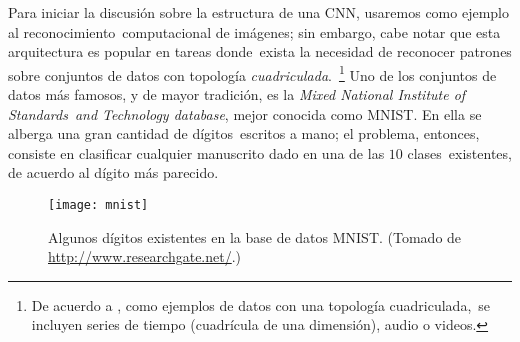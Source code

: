 Para iniciar la discusión sobre la estructura de una CNN, usaremos como ejemplo al reconocimiento\
computacional de imágenes; sin embargo, cabe notar que esta arquitectura es popular en tareas donde\
exista la necesidad de reconocer patrones sobre conjuntos de datos con topología \emph{cuadriculada}.\
\footnote{De acuerdo a \cite{goodfellow-et-al-2016}, como ejemplos de datos con una topología cuadriculada,\
  se incluyen series de tiempo (cuadrícula de una dimensión), audio o videos.}
Uno de los conjuntos de datos más famosos, y de mayor tradición, es la \emph{Mixed National Institute of Standards}\
\emph{and Technology database}, mejor conocida como MNIST. En ella se alberga una gran cantidad de dígitos\
escritos a mano; el problema, entonces, consiste en clasificar cualquier manuscrito dado en una de las $10$ clases\
existentes, de acuerdo al dígito más parecido.\par

\begin{figure}
  \centering
  \texttt{[image: mnist]}
  \caption{Algunos dígitos existentes en la base de datos MNIST.
    (Tomado de \url{http://www.researchgate.net/}.)}
  \label{mnist_fig}
\end{figure}

